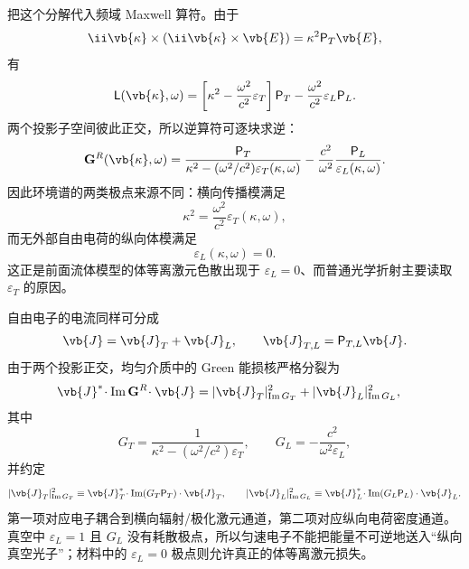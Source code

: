 把这个分解代入频域 Maxwell 算符。由于
\[
\ii\vb{\kappa}\times
(\ii\vb{\kappa}\times\vb{E})
=\kappa^2\mathsf P_T\vb{E},
\]
有
\begin{equation*}
\mathsf L(\vb{\kappa},\omega)
=\left[\kappa^2-\frac{\omega^2}{c^2}\varepsilon_T\right]\mathsf P_T
-\frac{\omega^2}{c^2}\varepsilon_L\mathsf P_L.
\end{equation*}
两个投影子空间彼此正交，所以逆算符可逐块求逆：
\begin{equation}
{
\mathbf G^R(\vb{\kappa},\omega)
=\frac{\mathsf P_T}
{\kappa^2-(\omega^2/c^2)\varepsilon_T(\kappa,\omega)}
-\frac{c^2}{\omega^2}
\frac{\mathsf P_L}{\varepsilon_L(\kappa,\omega)}.}
\label{eq:isotropic_nonlocal_green_LT_decomposition}
\end{equation}
因此环境谱的两类极点来源不同：横向传播模满足
\begin{equation*}
\kappa^2=\frac{\omega^2}{c^2}\varepsilon_T(\kappa,\omega),
\end{equation*}
而无外部自由电荷的纵向体模满足
\begin{equation*}
\varepsilon_L(\kappa,\omega)=0.
\end{equation*}
这正是前面流体模型的体等离激元色散出现于 $\varepsilon_L=0$、而普通光学折射主要读取 $\varepsilon_T$ 的原因。

自由电子的电流同样可分成
\[
\vb{J}=\vb{J}_T+\vb{J}_L,
\qquad
\vb{J}_{T,L}=\mathsf P_{T,L}\vb{J}.
\]
由于两个投影正交，均匀介质中的 Green 能损核严格分裂为
\begin{equation}
{
\begin{aligned}
\vb{J}^*\!\cdot\operatorname{Im}\mathbf G^R\!\cdot\vb{J}
={}&|\vb{J}_T|_{\operatorname{Im}G_T}^2
+|\vb{J}_L|_{\operatorname{Im}G_L}^2,
\end{aligned}}
\label{eq:electron_loss_LT_split}
\end{equation}
其中
\[
G_T=\frac1{\kappa^2-(\omega^2/c^2)\varepsilon_T},
\qquad
G_L=-\frac{c^2}{\omega^2\varepsilon_L},
\]
并约定
\[
|\vb{J}_T|_{\operatorname{Im}G_T}^2
\equiv
\vb{J}_T^*\!\cdot\operatorname{Im}(G_T\mathsf P_T)\cdot\vb{J}_T,
\qquad
|\vb{J}_L|_{\operatorname{Im}G_L}^2
\equiv
\vb{J}_L^*\!\cdot\operatorname{Im}(G_L\mathsf P_L)\cdot\vb{J}_L.
\]
第一项对应电子耦合到横向辐射/极化激元通道，第二项对应纵向电荷密度通道。真空中 $\varepsilon_L=1$ 且 $G_L$ 没有耗散极点，所以匀速电子不能把能量不可逆地送入“纵向真空光子”；材料中的 $\varepsilon_L=0$ 极点则允许真正的体等离激元损失。

